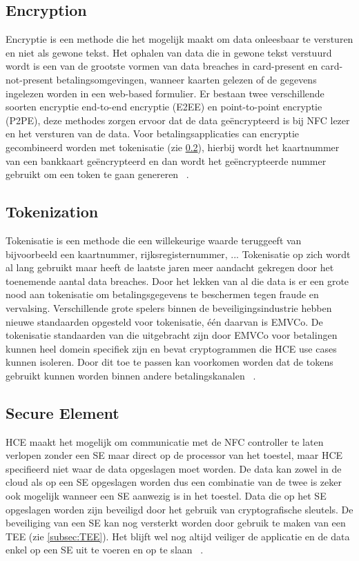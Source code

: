 \subsection{Encryption}
Encryptie is een methode die het mogelijk maakt om data onleesbaar te versturen en niet als gewone tekst. Het ophalen van data die in gewone tekst verstuurd wordt is een van de grootste vormen van data breaches in card-present en card-not-present betalingsomgevingen, wanneer kaarten gelezen of de gegevens ingelezen worden in een web-based formulier. Er bestaan twee verschillende soorten encryptie end-to-end encryptie (E2EE) en point-to-point encryptie (P2PE), deze methodes zorgen ervoor dat de data geëncrypteerd is bij NFC lezer en het versturen van de data. Voor betalingsapplicaties can encryptie gecombineerd worden met tokenisatie (zie \ref{subsec:tok}), hierbij wordt het kaartnummer van een bankkaart geëncrypteerd en dan wordt het geëncrypteerde nummer gebruikt om een token te gaan genereren ~\autocite{SCA2014}.

\subsection{Tokenization}
\label{subsec:tok}
Tokenisatie is een methode die een willekeurige waarde teruggeeft van bijvoorbeeld een kaartnummer, rijksregisternummer, ... Tokenisatie op zich wordt al lang gebruikt maar heeft de laatste jaren meer aandacht gekregen door het toenemende aantal data breaches. Door het lekken van al die data is er een grote nood aan tokenisatie om betalingsgegevens te beschermen tegen fraude en vervalsing. Verschillende grote spelers binnen de beveiligingsindustrie hebben nieuwe standaarden opgesteld voor tokenisatie, één daarvan is EMVCo. De tokenisatie standaarden van die uitgebracht zijn door EMVCo voor betalingen kunnen heel domein specifiek zijn en bevat cryptogrammen die HCE use cases kunnen isoleren. Door dit toe te passen kan voorkomen worden dat de tokens gebruikt kunnen worden binnen andere betalingskanalen ~\autocite{SCA2014}.

\subsection{Secure Element}
HCE maakt het mogelijk om communicatie met de NFC controller te laten verlopen zonder een SE maar direct op de processor van het toestel, maar HCE specifieerd niet waar de data opgeslagen moet worden. De data kan zowel in de cloud als op een SE opgeslagen worden dus een combinatie van de twee is zeker ook mogelijk wanneer een SE aanwezig is in het toestel. Data die op het SE opgeslagen worden zijn beveiligd door het gebruik van cryptografische sleutels. De beveiliging van een SE kan nog versterkt worden door gebruik te maken van een TEE (zie \ref{subsec:TEE}). Het blijft wel nog altijd veiliger de applicatie en de data enkel op een SE uit te voeren en op te slaan ~\autocite{SCA2014}.


